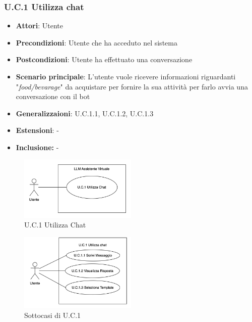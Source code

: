 \subsubsection{U.C.1 Utilizza chat} %
\begin{itemize}
    \item \textbf{Attori}: Utente
    \item \textbf{Precondizioni}: Utente che ha acceduto nel sistema
    \item \textbf{Postcondizioni}: Utente ha effettuato una conversazione
    \item \textbf{Scenario principale}: L'utente vuole ricevere informazioni riguardanti "\textit{food/bevarage}" da acquistare per fornire la sua attività per farlo avvia una conversazione con il bot
    \item \textbf{Generalizzaioni}: U.C.1.1, U.C.1.2, U.C.1.3
    \item \textbf{Estensioni}: -
    \item \textbf{Inclusione:} -
\end{itemize}
\begin{figure}[h!]
    \centering
    \includegraphics[width=0.5\textwidth]{img/UC1.png}
    \caption{U.C.1 Utilizza Chat}
\end{figure}
\begin{figure}[h!]
    \centering
    \includegraphics[width=0.5\textwidth]{img/SottocasiUC1.png}
    \caption{Sottocasi di U.C.1}
\end{figure}

